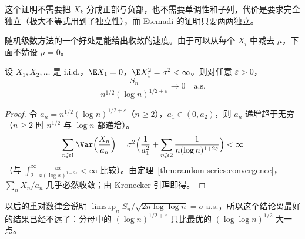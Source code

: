 这个证明不需要把 $X_k$ 分成正部与负部，也不需要单调性和子列，代价是要求完全独立（极大不等式用到了独立性），而 Etemadi 的证明只要两两独立。


随机级数方法的一个好处是能给出收敛的速度。由于可以从每个 $X_i$ 中减去 $\mu$，下面不妨设 $\mu=0$。

\begin{theorem}\label{thm:random-series:rate-L2}
设 $X_1,X_2,\dots$ 是 i.i.d.，$\E X_1=0$，$\E X_1^2=\sigma^2<\infty$。则对任意 $\varepsilon>0$，
\[
\frac{S_n}{n^{1/2}(\log n)^{1/2+\varepsilon}}\to0\quad\text{a.s.}
\]
\end{theorem}
\begin{proof}
令 $a_n=n^{1/2}(\log n)^{1/2+\varepsilon}$（$n\geqslant2$），$a_1\in(0,a_2)$，则 $a_n$ 递增趋于无穷（$n\geqslant2$ 时 $n^{1/2}$ 与 $\log n$ 都递增）。
\[
\sum_{n\geqslant1}\Var\Bigl(\frac{X_n}{a_n}\Bigr)=\sigma^2\Bigl(\frac1{a_1^2}+\sum_{n\geqslant2}\frac1{n(\log n)^{1+2\varepsilon}}\Bigr)<\infty
\]
（与 $\int_2^\infty\frac{\dd x}{x(\log x)^{1+2\varepsilon}}<\infty$ 比较）。由定理~\ref{thm:random-series:convergence}，$\sum_nX_n/a_n$ 几乎必然收敛；由 Kronecker 引理即得。
\end{proof}

以后的重对数律会说明 $\limsup_nS_n/\sqrt{2n\log\log n}=\sigma$ a.s.，所以这个结论离最好的结果已经不远了：分母中的 $(\log n)^{1/2+\varepsilon}$ 只比最优的 $(\log\log n)^{1/2}$ 大一点。

